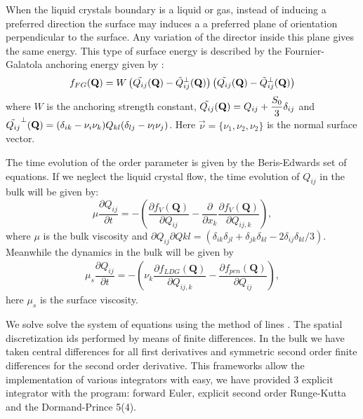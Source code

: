 \documentclass[final,5p,times,twocolumn]{elsarticle}
\begin{document}
When the liquid crystals boundary is a liquid or gas, instead of
inducing a preferred direction the surface may induces a a preferred
plane of orientation perpendicular to the surface. Any variation of
the director inside this plane gives the same energy. This type of
surface energy is described by the Fournier-Galatola anchoring energy
given by \cite{Sec2012}:
\begin{equation} \label{eq:penalizacao}
f_{FG}(\mathbf{Q})=W\left( \tilde{Q_{ij}}(\bold{Q}) - \tilde{Q}_{ij}^{\perp}(\bold{Q}) \right)\left( \tilde{Q_{ij}}(\bold{Q}) - \tilde{Q}_{ij}^{\perp}(\bold{Q}) \right)
\end{equation}
where $W$ is the anchoring strength constant,
$\tilde{Q_{ij}}(\bold{Q})=Q_{ij}+\dfrac{S_0}{3} \delta_{ij}$ and
$\tilde{Q_{ij}}^{\perp}(\bold{Q})=(\delta_{ik}-\nu_i \nu_k)Q_{kl}
(\delta_{lj}-\nu_l \nu_j)$. Here $\vec{\nu}=\lbrace\nu_1,\nu_2,\nu_2 \rbrace$ is the normal surface vector.

The time evolution of the order parameter is given by the
Beris-Edwards set of equations. If we neglect the liquid crystal flow,
the time evolution of $Q_{ij}$ in the bulk will be given by:
\begin{equation} \label{eq:dissipacao_Q}
\mu \dfrac{\partial Q_{ij}}{ \partial t} = -\left( \dfrac{\partial f_{V}(\mathbf{Q})}{\partial Q_{ij}} - \dfrac{\partial}{\partial x_k } \dfrac{\partial f_V(\mathbf{Q})}{\partial Q_{ij,k}}  \right),
\end{equation}
%
where $\mu$ is the bulk viscosity and $ \partial Q_{ij} \partial Q{kl} = (\delta_{ik} \delta_{jl}+\delta_{jk} \delta_{kl}-2 \delta_{ij} \delta_{kl}/3)$. Meanwhile the dynamics in the bulk will be given by
\begin{align}
\mu_s \dfrac{\partial Q_{ij}}{\partial t}=-\left(\nu_k\dfrac{\partial f_{LDG}(\mathbf{Q})}{\partial Q_{ij,k}} -\dfrac{\partial f_{pen}(\mathbf{Q})}{\partial Q_{ij}}\right),
\end{align}
here $\mu_s$ is the surface viscosity.

We solve solve the system of equations using the method of lines
\cite{}. The spatial discretization ids performed by means of finite
differences. In the bulk we have taken central differences for all
first derivatives and symmetric second order finite differences for
the second order derivative. This frameworks allow the implementation
of various integrators with easy, we have provided 3 explicit
integrator with the program: forward Euler, explicit second order
Runge-Kutta and the Dormand-Prince 5(4).
\end{document}
